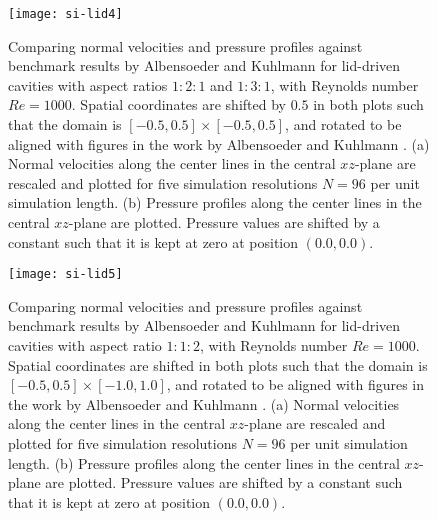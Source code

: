 \documentclass[times, 10pt]{article}
\newcommand{\Rey}{\textit{Re}}
\begin{document}
            \begin{figure}
            \centering
                \texttt{[image: si-lid4]}
                \caption{Comparing normal velocities and pressure profiles against benchmark results by Albensoeder and Kuhlmann \cite{albensoeder05} for lid-driven cavities with aspect ratios $1:2:1$ and $1:3:1$, with Reynolds number $\Rey=1000$.
                Spatial coordinates are shifted by $0.5$ in both plots such that the domain is $[-0.5,0.5]\times[-0.5,0.5]$, and rotated to be aligned with figures in the work by Albensoeder and Kuhlmann \cite{albensoeder05}.
                (a) Normal velocities along the center lines in the central $xz$-plane are rescaled and plotted for five simulation
                resolutions $N=96$ per unit simulation length. (b) Pressure profiles along the center lines in the central $xz$-plane are plotted. Pressure
                values are shifted by a constant such that it is kept at zero at position $(0.0, 0.0)$. }\label{fig:aspect23_profiles}
            \end{figure}

            \begin{figure}
            \centering
                \texttt{[image: si-lid5]}
                \caption{Comparing normal velocities and pressure profiles against benchmark results by Albensoeder and Kuhlmann \cite{albensoeder05} for lid-driven cavities with aspect ratio $1:1:2$, with Reynolds number $\Rey=1000$.
                Spatial coordinates are shifted in both plots such that the domain is $[-0.5,0.5]\times[-1.0,1.0]$, and rotated to be aligned with figures in the work by Albensoeder and Kuhlmann \cite{albensoeder05}.
                (a) Normal velocities along the center lines in the central $xz$-plane are rescaled and plotted for five simulation
                resolutions $N=96$ per unit simulation length. (b) Pressure profiles along the center lines in the central $xz$-plane are plotted. Pressure
                values are shifted by a constant such that it is kept at zero at position $(0.0, 0.0)$. }\label{fig:aspectz2_profiles}
            \end{figure}
\end{document}
